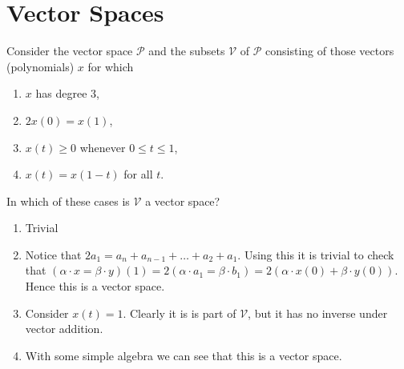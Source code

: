 \section{Vector Spaces}


\setcounter{problem}{4}
\begin{problem}
  Consider the vector space $\mathcal{P}$ and the subsets $\mathcal{V}$ of $\mathcal{P}$ consisting of those vectors (polynomials) $x$ for which
  \begin{enumerate}[label=(\alph*)]
    \item $x$ has degree $3$,
    \item $2x(0) = x(1)$,
    \item $x(t) \ge 0$ whenever $0 \le t \le 1$,
    \item $x(t) = x(1 - t)$ for all $t$.
  \end{enumerate}
  In which of these cases is $\mathcal{V}$ a vector space?
\end{problem}

\begin{solution}
  \begin{enumerate}[label=(\alph*)]
    \item Trivial
    \item Notice that $2a_1 = a_n + a_{n - 1} + \ldots + a_2 + a_1$.
      Using this it is trivial to check that $(\alpha \cdot x = \beta \cdot y)(1) = 2(\alpha \cdot a_1 = \beta \cdot b_1) = 2(\alpha \cdot x(0) + \beta \cdot y(0))$.
      Hence this is a vector space.
    \item Consider $x(t) = 1$.
      Clearly it is is part of $\mathcal{V}$, but it has no inverse under vector addition.
    \item With some simple algebra we can see that this is a vector space.
  \end{enumerate}
\end{solution}


